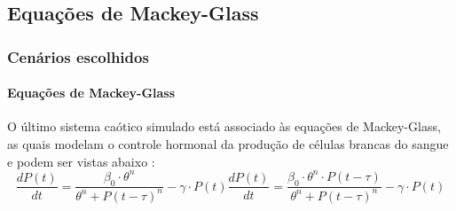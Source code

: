 \documentclass{beamer}
\begin{document}
\subsection{Equações de Mackey-Glass}
\begin{frame}
	\frametitle{Cenários escolhidos}
	\framesubtitle{Equações de Mackey-Glass}
	\justifying O último sistema caótico simulado está associado às equações de Mackey-Glass, as quais modelam o controle hormonal da produção de células brancas do sangue e podem ser vistas abaixo \cite{mackey1977oscillation}:
\begin{subequations}
\begin{equation}
\frac{dP(t)}{dt} = \frac{\beta_0\cdot \theta^n}{\theta^n + P(t - \tau)^n} - \gamma\cdot P(t)
\end{equation}
\begin{equation}\label{eq:mackey-glass-chaos}
\frac{dP(t)}{dt} = \frac{\beta_0\cdot \theta^n \cdot P(t - \tau)}{\theta^n + P(t - \tau)^n} - \gamma\cdot P(t)
\end{equation}
\end{subequations}
\end{frame}
\end{document}
